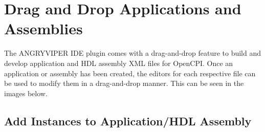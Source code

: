 \newpage

\section{Drag and Drop Applications and Assemblies}
\label{sec:drag_and_drop}
\begin{flushleft}

The ANGRYVIPER IDE plugin comes with a drag-and-drop feature to build and develop application and HDL assembly XML files for OpenCPI. Once an application or assembly has been created, the editors for each respective file can be used to modify them in a drag-and-drop manner. This can be seen in the images below.

\end{flushleft}

\subsection{Add Instances to Application/HDL Assembly}
\label{sec:add_application_instances}
